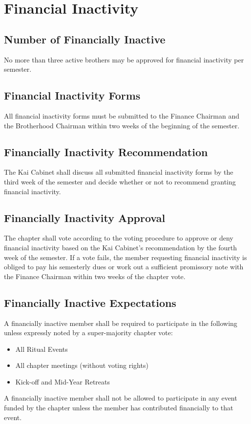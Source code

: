 \chapter{Financial Inactivity}
\label{cha:financial-inactivity}

\section{Number of Financially Inactive}

No more than three active brothers may be approved for financial inactivity per
semester.

\section{Financial Inactivity Forms}

All financial inactivity forms must be submitted to the Finance Chairman and
the Brotherhood Chairman within two weeks of the beginning of the semester.

\section{Financially Inactivity Recommendation}

The Kai Cabinet shall discuss all submitted financial inactivity forms by the
third week of the semester and decide whether or not to recommend granting
financial inactivity.

\section{Financially Inactivity Approval}

The chapter shall vote according to the voting procedure to approve or deny
financial inactivity based on the Kai Cabinet’s recommendation by the fourth
week of the semester.
If a vote fails, the member requesting financial inactivity is obliged to pay
his semesterly dues or work out a sufficient promissory note with the Finance
Chairman within two weeks of the chapter vote.

\section{Financially Inactive Expectations}

A financially inactive member shall be required to participate in the following
unless expressly noted by a super-majority chapter vote:
\begin{itemize}
    \item All Ritual Events
    \item All chapter meetings (without voting rights)
    \item Kick-off and Mid-Year Retreats
\end{itemize}
A financially inactive member shall not be allowed to participate in any event
funded by the chapter unless the member has contributed financially to that
event.

